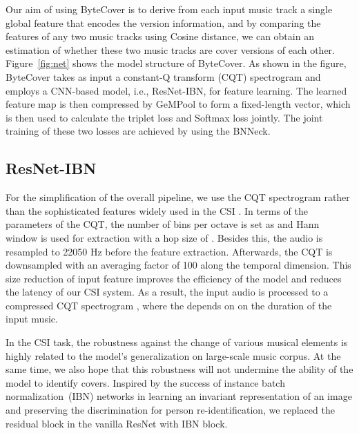 \documentclass{article}
\newcommand{\figref}[1]{\mbox{Figure~\ref{#1}}}
\begin{document}
Our aim of using ByteCover is to derive from each input music track a single global feature that encodes the version information, and by comparing the features of any two music tracks using Cosine distance, we can obtain an estimation of whether these two music tracks are cover versions of each other. \figref{fig:net} shows the model structure of ByteCover. As shown in the figure, ByteCover takes as input a constant-Q transform (CQT) spectrogram and employs a CNN-based model, i.e., ResNet-IBN, for feature learning. The learned feature map is then compressed by GeMPool to form a fixed-length vector, which is then used to calculate the triplet loss and Softmax loss jointly. The joint training of these two losses are achieved by using the BNNeck.




\par




 



\vspace{-1em}
\subsection{ResNet-IBN}









For the simplification of the overall pipeline, we use the CQT spectrogram rather than the sophisticated features widely used in the CSI \cite{yesiler2020accurate}. 
In terms of the parameters of the CQT, the number of bins per octave is set as  and Hann window is used for extraction with a hop size of . Besides this, the audio is resampled to 22050 Hz before the feature extraction. Afterwards, the CQT is downsampled with an averaging factor of 100 along the temporal dimension.  This size reduction of input feature improves the efficiency of the model and reduces the latency of our CSI system. As a result, the input audio is processed to a compressed CQT spectrogram , where the  depends on on the duration of the input music.

In the CSI task, the robustness against the change of various musical elements is highly related to the model's generalization on large-scale music corpus. At the same time, we also hope that this robustness will not undermine the ability of the model to identify covers.
Inspired by the success of instance batch normalization~(IBN) networks \cite{pan2018two} in learning an invariant representation of an image and preserving the discrimination for person re-identification, we replaced the residual block in the vanilla ResNet \cite{he2016deep} with IBN block.\par
\end{document}
